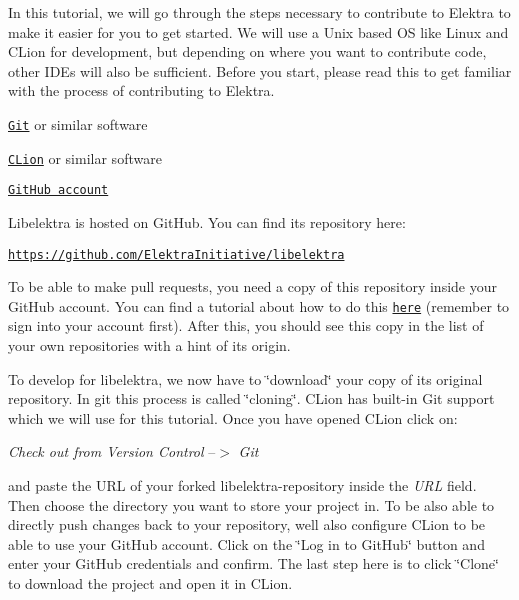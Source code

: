 In this tutorial, we will go through the steps necessary to contribute to Elektra to make it easier for you to get started. We will use a Unix based OS like Linux and C\+Lion for development, but depending on where you want to contribute code, other I\+D\+Es will also be sufficient. Before you start, please read this to get familiar with the process of contributing to Elektra.


\begin{DoxyItemize}
\item \href{https://git-scm.com/download}{\tt Git} or similar software
\item \href{https://www.jetbrains.com/clion/}{\tt C\+Lion} or similar software
\item \href{https://github.com/}{\tt Git\+Hub account}
\end{DoxyItemize}

Libelektra is hosted on Git\+Hub. You can find its repository here\+:


\begin{DoxyItemize}
\item \href{https://github.com/ElektraInitiative/libelektra}{\tt https\+://github.\+com/\+Elektra\+Initiative/libelektra}
\end{DoxyItemize}

To be able to make pull requests, you need a copy of this repository inside your Git\+Hub account. You can find a tutorial about how to do this \href{https://help.github.com/en/articles/fork-a-repo}{\tt here} (remember to sign into your account first). After this, you should see this copy in the list of your own repositories with a hint of it\textquotesingle{}s origin.

To develop for libelektra, we now have to \char`\"{}download\char`\"{} your copy of its original repository. In git this process is called \char`\"{}cloning\char`\"{}. C\+Lion has built-\/in Git support which we will use for this tutorial. Once you have opened C\+Lion click on\+:

{\itshape Check out from Version Control} --$>$ {\itshape Git}

and paste the U\+RL of your forked libelektra-\/repository inside the {\itshape U\+RL} field. Then choose the directory you want to store your project in. To be also able to directly push changes back to your repository, we\textquotesingle{}ll also configure C\+Lion to be able to use your Git\+Hub account. Click on the \char`\"{}\+Log in to Git\+Hub\char`\"{} button and enter your Git\+Hub credentials and confirm. The last step here is to click \char`\"{}\+Clone\char`\"{} to download the project and open it in C\+Lion.

